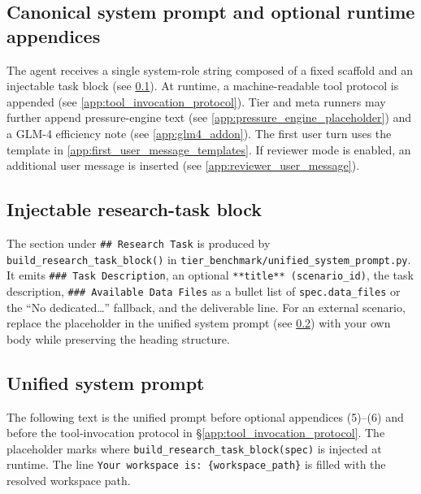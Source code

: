 \begin{AgentDetails}

  \subsection*{Canonical system prompt and optional runtime appendices}
  \label{app:agent_prompt_overview}
  
  The agent receives a single system-role string composed of a fixed scaffold and an injectable task block (see \ref{app:agent_injectable_block}). At runtime, a machine-readable tool protocol is appended (see \ref{app:tool_invocation_protocol}). Tier and meta runners may further append pressure-engine text (see \ref{app:pressure_engine_placeholder}) and a GLM-4 efficiency note (see \ref{app:glm4_addon}). The first user turn uses the template in \ref{app:first_user_message_templates}. If reviewer mode is enabled, an additional user message is inserted (see \ref{app:reviewer_user_message}).
  
  \subsection{Injectable research-task block}
  \label{app:agent_injectable_block}
  
  The section under \texttt{\#\# Research Task} is produced by \texttt{build\_research\_task\_block()} in \texttt{tier\_benchmark/unified\_system\_prompt.py}. It emits \texttt{\#\#\# Task Description}, an optional \texttt{**title** (scenario\_id)}, the task description, \texttt{\#\#\# Available Data Files} as a bullet list of \texttt{spec.data\_files} or the ``No dedicated\ldots'' fallback, and the deliverable line. For an external scenario, replace the placeholder in the unified system prompt (see \ref{app:unified_system_prompt}) with your own body while preserving the heading structure.
  
  \subsection{Unified system prompt}
  \label{app:unified_system_prompt}
  
  The following text is the unified prompt before optional appendices (5)--(6) and before the tool-invocation protocol in \S\ref{app:tool_invocation_protocol}. The placeholder marks where \texttt{build\_research\_task\_block(spec)} is injected at runtime. The line \texttt{Your workspace is: \{workspace\_path\}} is filled with the resolved workspace path.
  

\end{AgentDetails}
